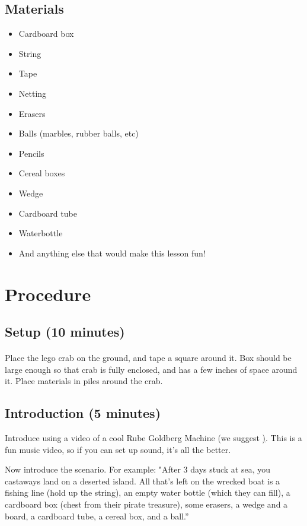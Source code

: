 \documentclass{lessonplan}
\begin{document}
    \subsection{Materials}
      \begin{itemize}
        \item Cardboard box
		\item String
		\item Tape
		\item Netting
		\item Erasers
		\item Balls (marbles, rubber balls, etc)
		\item Pencils
		\item Cereal boxes
		\item Wedge
		\item Cardboard tube
		\item Waterbottle
		\item And anything else that would make this lesson fun!
      \end{itemize}

  \section{Procedure}
    \subsection{Setup (10 minutes)}
	\paragraph{}
      Place the lego crab on the ground, and tape a square around it. Box should be large enough so that crab is fully enclosed, and has a few inches
	of space around it. 
	Place materials in piles around the crab.

    \subsection{Introduction (5 minutes)}
      Introduce using a video of a cool Rube Goldberg Machine (we suggest
      \href{https://www.youtube.com/watch?v=qybUFnY7Y8w}). This is a fun
      music video, so if you can set up sound, it's all the better.

      Now introduce the scenario. For example:
      "After 3 days stuck at sea, you castaways land on a deserted island.
      All that's left on the wrecked boat is a fishing line (hold up the string),
      an empty water bottle (which they can fill), a cardboard box (chest from
      their pirate treasure), some erasers, a wedge and a board,
      a cardboard tube, a cereal box, and a ball.''
\end{document}
